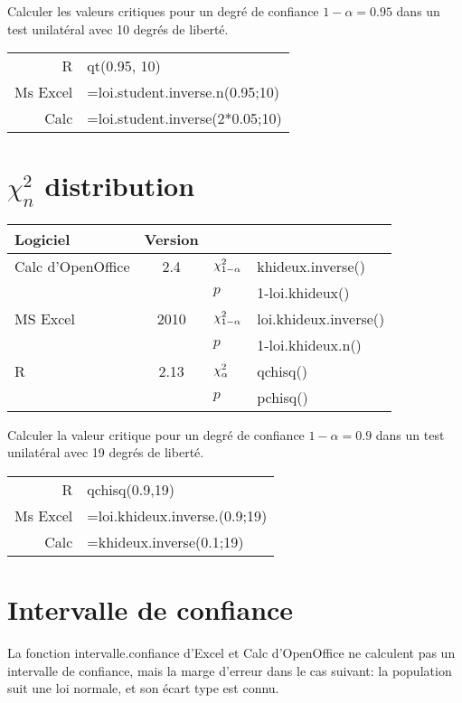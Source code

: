 \begin{ex}
Calculer les valeurs critiques pour un degr\'e de confiance $1-\alpha=0.95$ dans un test unilat\'eral avec 10 degr\'es de libert\'e.

\begin{tabular}{|rl|}
\hline
	R & qt(0.95, 10)\\
	Ms Excel & {\sc =loi.student.inverse.n(0.95;10)}\\
	Calc & {\sc =loi.student.inverse(2*0.05;10)}\\
\hline
\end{tabular}
\end{ex}


\section{$\chi^2_n$ distribution}
\begin{tabular}{lc|l@{ = }l}
	Logiciel & Version\\
	\hline
	Calc d'OpenOffice & 2.4 & $\mathcal{\chi}^2_{1-\alpha}$ & {\sc khideux.inverse}()\\
	 &  & $p$ & 1-{\sc loi.khideux}()\\
	MS Excel & 2010 & $\mathcal{\chi}^2_{1-\alpha}$ & {\sc loi.khideux.inverse}()\\
	 &  & $p$ & 1-{\sc loi.khideux.n}()\\
	R & 2.13 & $\mathcal{\chi}^2_{\alpha}$ & {\sc qchisq}()\\
	  &       & $p$          & pchisq()\\
\end{tabular}

\begin{ex}
Calculer la valeur critique pour un degr\'e de confiance $1-\alpha=0.9$ dans un test unilat\'eral avec 19 degr\'es de libert\'e.

\begin{tabular}{|rl|}
\hline
	R & qchisq(0.9,19)\\
	Ms Excel & {\sc =loi.khideux.inverse.(0.9;19)}\\
	Calc & {\sc =khideux.inverse(0.1;19)}\\
\hline
\end{tabular}
\end{ex}

\section{Intervalle de confiance}
La fonction {\sc intervalle.confiance} d'Excel et Calc d'OpenOffice ne calculent pas un intervalle de confiance, mais la marge d'erreur dans le cas suivant: la population suit une loi normale, et son \'ecart type est connu.


